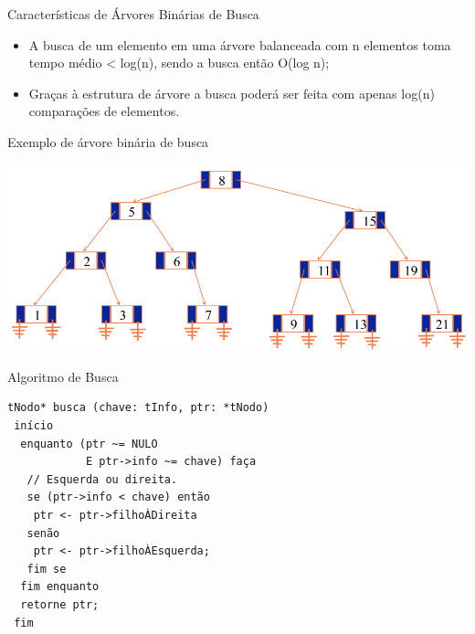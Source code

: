 \documentclass[12pt,table,xcolor={dvipsnames}]{beamer}
\begin{document}
\begin{frame}[fragile]{Características de Árvores Binárias de Busca}
          \begin{itemize}
          \item A busca de um elemento em uma árvore balanceada com n elementos toma tempo médio < log(n), sendo a busca então O(log n);
          \item Graças à estrutura de árvore a busca poderá ser feita com apenas log(n) comparações de elementos.
       	  \end{itemize}
\end{frame}

\begin{frame}[fragile]{Exemplo de árvore binária de busca}
\begin{center}
\includegraphics[scale=.3]{arv1.png} 
\end{center}
\end{frame}

\begin{frame}[fragile]{Algoritmo de Busca}
          \begin{lstlisting}
tNodo* busca (chave: tInfo, ptr: *tNodo)
 início
  enquanto (ptr ~= NULO 
            E ptr->info ~= chave) faça
   // Esquerda ou direita.
   se (ptr->info < chave) então
    ptr <- ptr->filhoÀDireita
   senão
    ptr <- ptr->filhoÀEsquerda;
   fim se
  fim enquanto
  retorne ptr;
 fim
		  \end{lstlisting}
\end{frame} 
\end{document}
